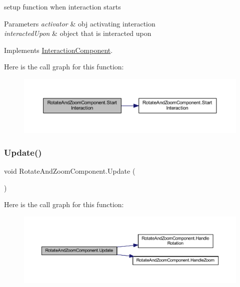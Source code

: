 setup function when interaction starts 


\begin{DoxyParams}{Parameters}
{\em activator} & obj activating interaction\\
\hline
{\em interacted\+Upon} & object that is interacted upon\\
\hline
\end{DoxyParams}


Implements \mbox{\hyperlink{class_interaction_component_a80d4c2288af453dd9611bbea092843e5}{Interaction\+Component}}.

Here is the call graph for this function\+:
\nopagebreak
\begin{figure}[H]
\begin{center}
\leavevmode
\includegraphics[width=350pt]{class_rotate_and_zoom_component_ac6afb9569858cf59c584c7bdfac41def_cgraph}
\end{center}
\end{figure}
\mbox{\label{class_rotate_and_zoom_component_af92720943f59348caa6f58952fec5c6b}} 
\subsubsection{\texorpdfstring{Update()}{Update()}}
{\footnotesize\ttfamily void Rotate\+And\+Zoom\+Component.\+Update (\begin{DoxyParamCaption}{ }\end{DoxyParamCaption})\hspace{0.3cm}{\ttfamily [private]}}

Here is the call graph for this function\+:
\nopagebreak
\begin{figure}[H]
\begin{center}
\leavevmode
\includegraphics[width=350pt]{class_rotate_and_zoom_component_af92720943f59348caa6f58952fec5c6b_cgraph}
\end{center}
\end{figure}


